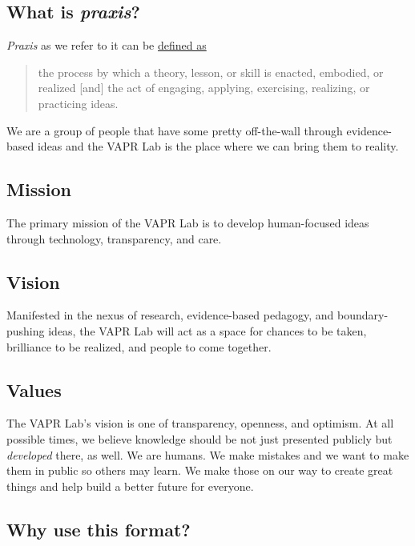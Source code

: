 \documentclass[12pt,]{memoir}
\begin{document}
\hypertarget{what-is-praxis}{%
\subsection{\texorpdfstring{What is \emph{praxis}?}{What is praxis?}}\label{what-is-praxis}}

\emph{Praxis} as we refer to it can be \href{https://en.wikipedia.org/wiki/Praxis_(process)}{defined as}

\begin{quote}
the process by which a theory, lesson, or skill is enacted, embodied, or realized {[}and{]} the act of engaging, applying, exercising, realizing, or practicing ideas.
\end{quote}

We are a group of people that have some pretty off-the-wall through evidence-based ideas and the VAPR Lab is the place where we can bring them to reality.

\hypertarget{mission}{%
\subsection{Mission}\label{mission}}

The primary mission of the VAPR Lab is to develop human-focused ideas through technology, transparency, and care.

\hypertarget{vision}{%
\subsection{Vision}\label{vision}}

Manifested in the nexus of research, evidence-based pedagogy, and boundary-pushing ideas, the VAPR Lab will act as a space for chances to be taken, brilliance to be realized, and people to come together.

\hypertarget{values}{%
\subsection{Values}\label{values}}

The VAPR Lab's vision is one of transparency, openness, and optimism. At all possible times, we believe knowledge should be not just presented publicly but \emph{developed} there, as well. We are humans. We make mistakes and we want to make them in public so others may learn. We make those on our way to create great things and help build a better future for everyone.

\hypertarget{why-use-this-format}{%
\subsection{Why use this format?}\label{why-use-this-format}}
\end{document}
